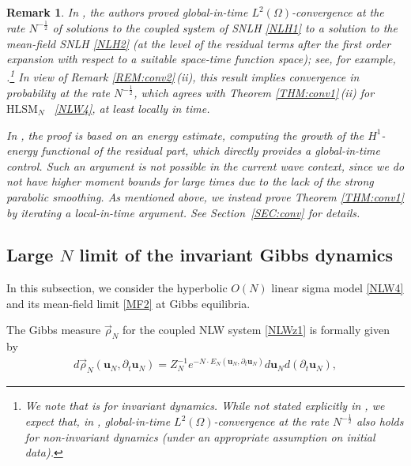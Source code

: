 \documentclass[letterpaper, 11pt,  reqno]{amsart}
\newtheorem{remark}[theorem]{Remark}
\newcommand{\1}{\hspace{0.5mm}\text{I}\hspace{0.2mm}}
\newcommand{\dt}{\partial_t}
\newcommand{\rhoo}{\vec \rho_N}
\newcommand{\HLS}{$\text{HLSM}_N$ }
\newcommand{\uu}{\mathbf{u}}
\renewcommand{\O}{\Omega}
\numberwithin{equation}{section}
\numberwithin{theorem}{section}
\begin{document}
\begin{remark}\label{REM:conv3}\rm
In \cite{SSZZ}, 
the authors proved 
global-in-time $L^2(\O)$-convergence at the rate $N^{-\frac 12}$ of solutions
to 
the coupled system of SNLH
\eqref{NLH1} to 
a solution to 
the mean-field SNLH \eqref{NLH2}
(at the level of  the residual
terms
after the first order expansion 
with respect to a suitable space-time function space);
see, for example,  \cite[(5.14)]{SSZZ}.\footnote{We note that 
\cite[(5.14)]{SSZZ} is for invariant dynamics.
While not stated explicitly in \cite{SSZZ}, 
we expect that, in \cite{SSZZ},  
global-in-time $L^2(\O)$-convergence at the rate $N^{-\frac 12}$
also holds
for non-invariant dynamics (under an appropriate assumption on initial data).
}
In view of 
Remark \ref{REM:conv2}\,(ii),
this result implies
convergence in probability at the  rate $N^{-\frac 12 }$,
which agrees with Theorem \ref{THM:conv1}\,(ii)
for \HLS~\eqref{NLW4}, at least locally in time.

In \cite{SSZZ}, 
the proof is based on an energy estimate, 
computing the growth of  the $H^1$-energy functional of the residual part, 
which directly provides
a global-in-time control.
Such an argument is not possible
in the current 
wave context, 
since 
we do not have 
 higher moment bounds
 for large times
due to the lack of the strong parabolic smoothing.
As mentioned above, we instead prove Theorem \ref{THM:conv1}
by iterating a local-in-time argument.
See Section~\ref{SEC:conv} for details.



\end{remark}





\subsection{Large $N$ limit of the invariant Gibbs dynamics} %
\label{SUBSEC:1.3}


In this subsection, 
we consider
 the hyperbolic $O(N)$ linear sigma model \eqref{NLW4} and its mean-field limit \eqref{MF2}
at Gibbs equilibria. 


The Gibbs measure $\rhoo$ for the 
coupled NLW system
\eqref{NLWz1}
is formally given by
\begin{align*}
d\rhoo 
(\uu_N, \dt \uu_N)
= Z_N^{-1} e^{-N\cdot  E_N (\uu_N, \dt \uu_N) } 
d \uu_N d (\dt \uu_N),  
\end{align*}
\end{document}
